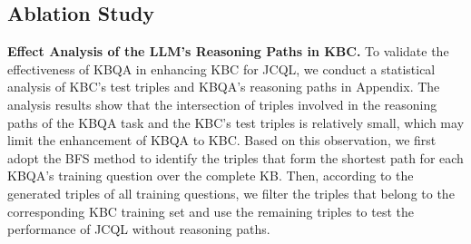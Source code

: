 \documentclass[11pt]{article}
\begin{document}
\subsection{Ablation Study}
\textbf{Effect Analysis of the LLM's Reasoning Paths in KBC.}
To validate the effectiveness of KBQA in enhancing KBC for JCQL, we conduct a statistical analysis of KBC's test triples and KBQA's reasoning paths in Appendix.
The analysis results show that the intersection of triples involved in the reasoning paths of the KBQA task and the KBC's test triples is relatively small, which may limit the enhancement of KBQA to KBC. Based on this observation, we first adopt the BFS method to identify the triples that form the shortest path for each KBQA's training question over the complete KB. Then, according to the generated triples of all training questions, we filter the triples that belong to the corresponding KBC training set and use the remaining triples to test the performance of JCQL without reasoning paths. 
\end{document}

